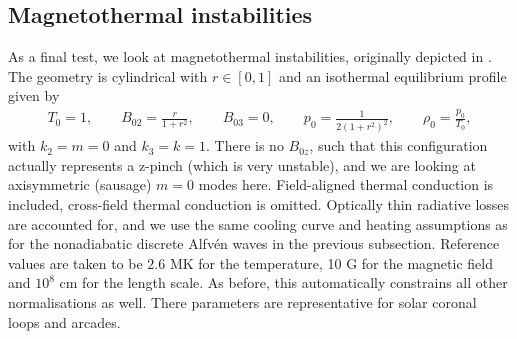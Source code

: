 \subsection{Magnetothermal instabilities}
As a final test, we look at magnetothermal instabilities, originally depicted in \citet{vanderlinden1992}. The geometry is cylindrical with $r \in [0, 1]$ and an isothermal equilibrium profile given by
\begin{equation} \label{eq: magnetothermal_equilibrium}
  \begin{gathered}
    T_0 = 1,
    \qquad
    B_{02} = \frac{r}{1 + r^2},
    \qquad
    B_{03} = 0,
    \qquad
    p_0 = \frac{1}{2\left(1 + r^2\right)^2},
    \qquad
    \rho_0 = \frac{p_0}{T_0},
  \end{gathered}
\end{equation}
with $k_2 = m = 0$ and $k_3 = k = 1$. There is no $B_{0z}$, such that this configuration actually represents a z-pinch (which is very unstable), and we are looking at axisymmetric (sausage) $m = 0$ modes here. Field-aligned thermal conduction is included, cross-field thermal conduction is omitted. Optically thin radiative losses are accounted for, and we use the same cooling curve and heating assumptions as for the nonadiabatic discrete Alfv\'en waves in the previous subsection. Reference values are taken to be $2.6$ MK for the temperature, 10 G for the magnetic field and $10^8$ cm for the length scale. As before, this automatically constrains all other normalisations as well. There parameters are representative for solar coronal loops and arcades.

